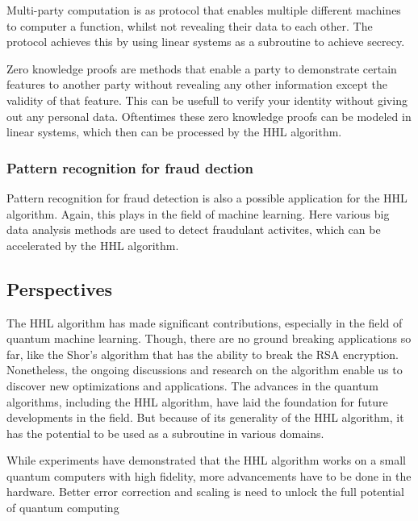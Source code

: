     Multi-party computation is as protocol that enables multiple different machines to computer a function, whilst not revealing their data to each other. 
    The protocol achieves this by using linear systems as a subroutine to achieve secrecy.

    Zero knowledge proofs are methods that enable a party to demonstrate certain features to another party without revealing any other information except the validity of that feature.
    This can be usefull to verify your identity without giving out any personal data.
    Oftentimes these zero knowledge proofs can be modeled in linear systems, which then can be processed by the HHL algorithm.

    \subsubsection{Pattern recognition for fraud dection}
    Pattern recognition for fraud detection is also a possible application for the HHL algorithm.
    Again, this plays in the field of machine learning. 
    Here various big data analysis methods are used to detect fraudulant activites, which can be accelerated by the HHL algorithm.

\subsection{Perspectives}
The HHL algorithm has made significant contributions, especially in the field of quantum machine learning. 
Though, there are no ground breaking applications so far, like the Shor's algorithm that has the ability to break the RSA encryption.
Nonetheless, the ongoing discussions and research on the algorithm enable us to discover new optimizations and applications.
The advances in the quantum algorithms, including the HHL algorithm, have laid the foundation for future developments in the field.
But because of its generality of the HHL algorithm, it has the potential to be used as a subroutine in various domains.

While experiments have demonstrated that the HHL algorithm works on a small quantum computers with high fidelity, 
more advancements have to be done in the hardware.
Better error correction and scaling is need to unlock the full potential of quantum computing








